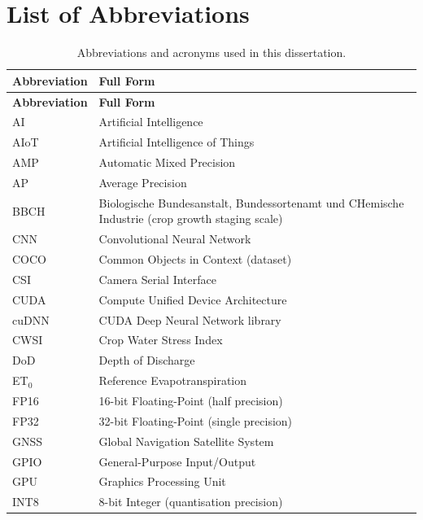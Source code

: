 \documentclass[12pt,a4paper]{report}
\renewcommand{\arraystretch}{1.3}
\begin{document}
\chapter{List of Abbreviations}
\pagestyle{fancy}
\thispagestyle{empty}

\begingroup
\small
\setlength{\parskip}{0pt}
\setlength{\tabcolsep}{4pt}
\renewcommand{\arraystretch}{1.2}
\begin{longtable}{|P{0.22\textwidth}|P{0.68\textwidth}|}
\caption{Abbreviations and acronyms used in this dissertation.}\\
\hline
{}
\textbf{Abbreviation} & \textbf{Full Form} \\ \hline
\endfirsthead
\hline
{}
\textbf{Abbreviation} & \textbf{Full Form} \\ \hline
\endhead
AI & Artificial Intelligence \\ \hline
AIoT & Artificial Intelligence of Things \\ \hline
AMP & Automatic Mixed Precision \\ \hline
AP & Average Precision \\ \hline
BBCH & Biologische Bundesanstalt, Bundessortenamt und CHemische Industrie (crop growth staging scale) \\ \hline
CNN & Convolutional Neural Network \\ \hline
COCO & Common Objects in Context (dataset) \\ \hline
CSI & Camera Serial Interface \\ \hline
CUDA & Compute Unified Device Architecture \\ \hline
cuDNN & CUDA Deep Neural Network library \\ \hline
CWSI & Crop Water Stress Index \\ \hline
DoD & Depth of Discharge \\ \hline
ET$_0$ & Reference Evapotranspiration \\ \hline
FP16 & 16-bit Floating-Point (half precision) \\ \hline
FP32 & 32-bit Floating-Point (single precision) \\ \hline
GNSS & Global Navigation Satellite System \\ \hline
GPIO & General-Purpose Input/Output \\ \hline
GPU & Graphics Processing Unit \\ \hline
INT8 & 8-bit Integer (quantisation precision) \\ \hline

\end{longtable}
\end{document}
